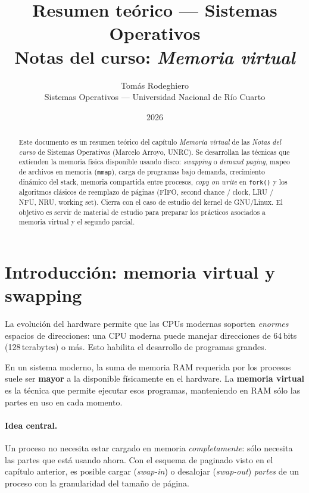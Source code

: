 \documentclass[11pt,a4paper]{article}
\title{
    \vspace{-2.5em}
    \textbf{Resumen teórico --- Sistemas Operativos} \\[0.3em]
    \large Notas del curso: \emph{Memoria virtual}
}
\author{
    Tomás Rodeghiero \\
    \small Sistemas Operativos --- Universidad Nacional de Río Cuarto
}
\date{2026}
\begin{document}
\maketitle

\begin{abstract}
\noindent
Este documento es un resumen teórico del capítulo \emph{Memoria virtual}
de las \emph{Notas del curso} de Sistemas Operativos (Marcelo Arroyo,
UNRC). Se desarrollan las técnicas que extienden la memoria física
disponible usando disco: \emph{swapping} o \emph{demand paging},
mapeo de archivos en memoria (\texttt{mmap}), carga de programas bajo
demanda, crecimiento dinámico del stack, memoria compartida entre
procesos, \emph{copy on write} en \texttt{fork()} y los algoritmos
clásicos de reemplazo de páginas (FIFO, second chance / clock, LRU /
NFU, NRU, working set). Cierra con el caso de estudio del kernel de
GNU/Linux. El objetivo es servir de material de estudio para preparar
los prácticos asociados a memoria virtual y el segundo parcial.
\end{abstract}

\tableofcontents
\bigskip

\section{Introducción: memoria virtual y swapping}

La evolución del hardware permite que las CPUs modernas soporten
\emph{enormes} espacios de direcciones: una CPU moderna puede manejar
direcciones de 64\,bits (128\,terabytes) o más. Esto habilita el
desarrollo de programas grandes.

\begin{importante}
En un sistema moderno, la suma de memoria RAM requerida por los procesos
suele ser \textbf{mayor} a la disponible físicamente en el hardware. La
\textbf{memoria virtual} es la técnica que permite ejecutar esos
programas, manteniendo en RAM sólo las partes en uso en cada momento.
\end{importante}

\paragraph{Idea central.}
Un proceso no necesita estar cargado en memoria \emph{completamente}:
sólo necesita las partes que está usando ahora. Con el esquema de
paginado visto en el capítulo anterior, es posible cargar
(\emph{swap-in}) o desalojar (\emph{swap-out}) \emph{partes} de un
proceso con la granularidad del tamaño de página.
\end{document}
